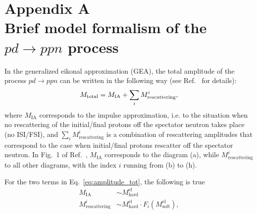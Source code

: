
\appendix


\renewcommand{\thechapter}{A}
    \makeatletter
   \renewcommand{\theequation}{\thechapter.\@arabic\c@equation}
    \makeatother
\chapter*{\LARGE Appendix A\\\tiny\vspace{2\baselineskip}\LARGE Brief model formalism of the $pd\rightarrow ppn$ process}
\label{app_formalism}






In the generalized eikonal approximation (GEA), the total amplitude of the process $pd\rightarrow ppn$ can be written in the following way (see Ref.~\cite{PhysRevC.107.014605} for details): \vspace{-0.3em} 
\begin{equation}
M_{\textrm{total}} = M_{\textrm{IA}} + \sum_{i}M_{\textrm{rescattering}}^{i},\label{eq:amplitude_tot}\\[-8pt]
\end{equation}
where $M_{\textrm{IA}}$ corresponds to the impulse approximation, i.e. to the situation when no rescattering of the initial/final protons off the spectator neutron takes place (no ISI/FSI), and $\sum_{i}M_{\textrm{rescattering}}^{i}$ is a combination of rescattering amplitudes that correspond to the case when initial/final protons rescatter off the spectator neutron. In Fig.~1 of Ref.~\cite{PhysRevC.107.014605}, $M_{\textrm{IA}}$ corresponds to the diagram (a), while $M_{\textrm{rescattering}}^{i}$ to all other diagrams, with the index $i$ running from (b) to (h).

For the two terms in Eq.~\eqref{eq:amplitude_tot}, the following is true\vspace{-0.3em} 
\begin{equation}
\begin{aligned}
M_{\textrm{IA}}&\sim M_{\textrm{hard}}^{\textrm{el}}\\
M_{\textrm{rescattering}}^{i}&\sim M_{\textrm{hard}}^{\textrm{el}}\cdot F_{i}\left(M_{\textrm{soft}}^{\textrm{el}}\right),\\[-8pt]
\end{aligned}\label{eq:amp_hard_soft}
\end{equation}

